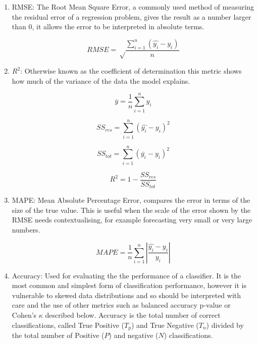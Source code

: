 \begin{enumerate}
    \item RMSE: The Root Mean Square Error, a commonly used method of measuring the residual error of a regression problem, gives the result as a number larger than 0, it allows the error to be interpreted in absolute terms.
    
        \begin{equation}
            RMSE = \sqrt \frac{ \sum_{i=1}^n (\hat{y_i}-y_i)}{n}
        \end{equation}
        
    \item $R^2$: Otherwise known as the coefficient of determination this metric shows how much of the variance of the data the model explains. 
    
    \begin{equation}
        \bar{y}=\frac{1}{n}\sum_{i=1}^n y_i
    \end{equation}
    
    \begin{equation}
        SS_{res}= \sum_{i=1}^n(\hat{y_i}-y_i)^2
    \end{equation}
    
    \begin{equation}
        SS_{tot}= \sum_{i=1}^n(\bar{y_i}-y_i)^2
    \end{equation}
    
    \begin{equation}
        R^2 = 1- \frac{SS_{res}}{SS_{tot}}
    \end{equation}
    
    \item MAPE: Mean Absolute Percentage Error, compares the error in terms of the size of the true value. This is useful when the scale of the error shown by the RMSE needs contextualising, for example forecasting very small or very large numbers.
    
    \begin{equation}
        MAPE= \frac{1}{n}\sum_{i=1}^n\left | \frac{\hat{y_i}-y_i}{y_i} \right |
    \end{equation}
    
    \item Accuracy: Used for evaluating the the performance of a classifier. It is the most common and simplest form of classification performance, however it is vulnerable to skewed data distributions and so should be interpreted with care and the use of other metrics such as balanced accuracy p-value or Cohen's $\kappa$ described below. Accuracy is the total number of correct classifications, called True Positive ($T_p$) and True Negative ($T_n$)  divided by the total number of Positive ($P$) and negative ($N$) classifications.
    

\end{enumerate}
